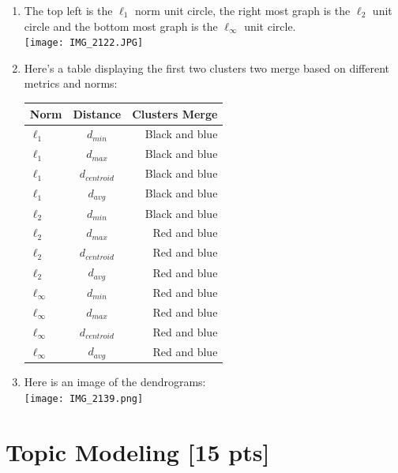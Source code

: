 \documentclass[submit]{harvardml}
\begin{document}
	\begin{enumerate}
		
		\item The top left is the $\ell_1$ norm unit circle, the right most graph is the $\ell_2$ unit circle and the bottom most graph is the $\ell_\infty$ unit circle.  \\ 
		
		\texttt{[image: IMG\_2122.JPG]}
		
		\item Here's a table displaying the first two clusters two merge based on different metrics and norms: \\
		\begin{tabular}{l | c | r}
			
			Norm & Distance & Clusters Merge \\
			\hline
			$\ell_1$ & $d_{min}$ & Black and blue \\
			$\ell_1$ & $d_{max}$ & Black and blue \\
			$\ell_1$ & $d_{centroid}$ & Black and blue \\
			$\ell_1$ & $d_{avg}$ & Black and blue \\
			
			$\ell_2$ & $d_{min}$ & Black and blue \\
			$\ell_2$ & $d_{max}$ & Red and blue \\
			$\ell_2$ & $d_{centroid}$ & Red and blue \\
			$\ell_2$ & $d_{avg}$ & Red and blue \\
			
			$\ell_\infty$ & $d_{min}$ & Red and blue \\
			$\ell_\infty$ & $d_{max}$ & Red and blue \\
			$\ell_\infty$ & $d_{centroid}$ & Red and blue \\
			$\ell_\infty$ & $d_{avg}$ & Red and blue \\
			
		\end{tabular}
		
		\item Here is an image of the dendrograms: \\
		\texttt{[image: IMG\_2139.png]}
	\end{enumerate}
	
	
	
	\newpage 
	\section*{Topic Modeling [15 pts]}
	
\end{document}

